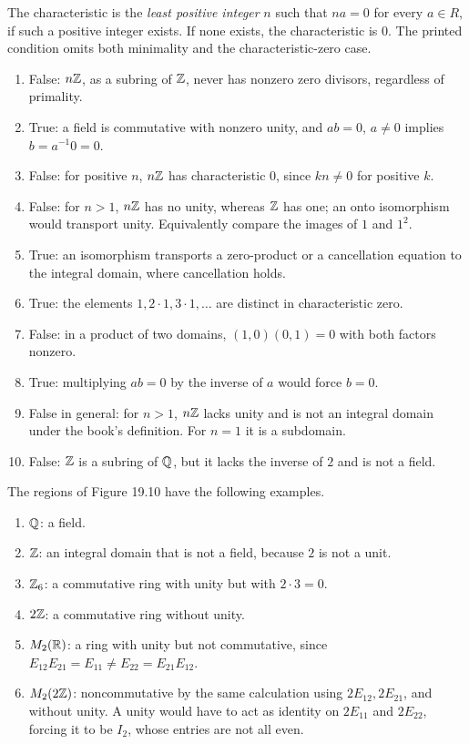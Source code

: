 The characteristic is the \emph{least positive integer} $n$ such that $na=0$ for every $a\in R$, if such a positive integer exists. If none exists, the characteristic is $0$. The printed condition omits both minimality and the characteristic-zero case.

\begin{enumerate}[label=(\alph*)]
\item False: $n\mathbb{Z}$, as a subring of $\mathbb{Z}$, never has nonzero zero divisors, regardless of primality.
\item True: a field is commutative with nonzero unity, and $ab=0$, $a\ne0$ implies $b=a^{-1}0=0$.
\item False: for positive $n$, $n\mathbb{Z}$ has characteristic $0$, since $k n\ne0$ for positive $k$.
\item False: for $n>1$, $n\mathbb{Z}$ has no unity, whereas $\mathbb{Z}$ has one; an onto isomorphism would transport unity. Equivalently compare the images of $1$ and $1^2$.
\item True: an isomorphism transports a zero-product or a cancellation equation to the integral domain, where cancellation holds.
\item True: the elements $1,2\cdot1,3\cdot1,\ldots$ are distinct in characteristic zero.
\item False: in a product of two domains, $(1,0)(0,1)=0$ with both factors nonzero.
\item True: multiplying $ab=0$ by the inverse of $a$ would force $b=0$.
\item False in general: for $n>1$, $n\mathbb{Z}$ lacks unity and is not an integral domain under the book's definition. For $n=1$ it is a subdomain.
\item False: $\mathbb{Z}$ is a subring of $\mathbb{Q}$, but it lacks the inverse of $2$ and is not a field.
\end{enumerate}

The regions of Figure 19.10 have the following examples.
\begin{enumerate}[label=\arabic*.]
\item $\mathbb{Q}$: a field.
\item $\mathbb{Z}$: an integral domain that is not a field, because $2$ is not a unit.
\item $\mathbb{Z}_6$: a commutative ring with unity but with $2\cdot3=0$.
\item $2\mathbb{Z}$: a commutative ring without unity.
\item $M_2(\mathbb{R})$: a ring with unity but not commutative, since $E_{12}E_{21}=E_{11}\ne E_{22}=E_{21}E_{12}$.
\item $M_2(2\mathbb{Z})$: noncommutative by the same calculation using $2E_{12},2E_{21}$, and without unity. A unity would have to act as identity on $2E_{11}$ and $2E_{22}$, forcing it to be $I_2$, whose entries are not all even.
\end{enumerate}

